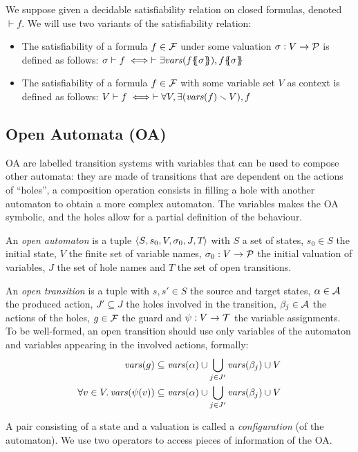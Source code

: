 \documentclass[runningheads]{llncs}
\begin{document}
 We suppose given a decidable satisfiability relation on closed formulas, denoted \({\vdash} f\).
We will use two variants of the satisfiability relation:
\begin{itemize}
\item The satisfiability of a formula \(f \in {\mathcal{F}}\) under some valuation \(\sigma: V \to \mathcal{P}\) is defined as follows:
\( \sigma \vdash f \iff \vdash \exists \fvars{f\psubst{\sigma}}, f\psubst{\sigma} \)
\item The satisfiability of a formula \(f \in {\mathcal{F}}\) with some variable set \(V\) as context is defined as follows:
\( V \vdash f \iff  \vdash \forall V, \exists{\left(\mathit{vars}{\left(f\right)} \smallsetminus V\right)}, f \)
\end{itemize}


\subsection{Open Automata (OA)}\label{sec:def}
 OA  are labelled transition systems with variables  that can be used to compose other automata: they are made of transitions that are dependent on the actions of ``holes'', a composition operation consists in filling a hole with another automaton to obtain a more complex automaton. The variables makes the OA symbolic, and the holes allow for a partial definition of the behaviour.

\begin{definition}
An \emph{open automaton} is a tuple \(\left<S_{},s_{0},V_{},\sigma_{0},J_{},T_{}\right>\) with \(S\) a set of states, \(s_0 \in S\) the initial state, \(V\) the finite set of variable names, \(\sigma_0: V \to \mathcal{P}\) the initial valuation of variables, \(J\) the set of hole names and \(T\) the set of open transitions. 

An \emph{open transition} is a tuple \nmm{\OTg} with \(s, s' \in S\) the source and target states, \(\alpha \in \mathcal{A}\) the produced action, \(J' \subseteq J\) the holes involved in the transition, \(\beta_j \in \mathcal{A}\) the actions of the holes, \(g \in {\mathcal{F}}\) the guard and \(\psi: V \to {\mathcal{T}}\) the variable assignments.
To be well-formed, an open transition should use only variables of the automaton and variables appearing in the involved actions, formally: 
\begin{align*}
\mathit{vars}{\left(g\right)}&\subseteq \mathit{vars}{\left(\alpha\right)}\cup \bigcup_{j \in J'} \mathit{vars}{\left(\beta_j\right)} \cup V \\ \forall v\in V.\, \mathit{vars}{\left(\psi(v)\right)}&\subseteq \mathit{vars}{\left(\alpha\right)}\cup \bigcup_{j \in J'} \mathit{vars}{\left(\beta_j\right)} \cup V
\end{align*}
\end{definition}
A pair consisting of a state and a valuation is called a \emph{configuration} (of the automaton).
We use two operators to access pieces of information of the OA.
\end{document}

